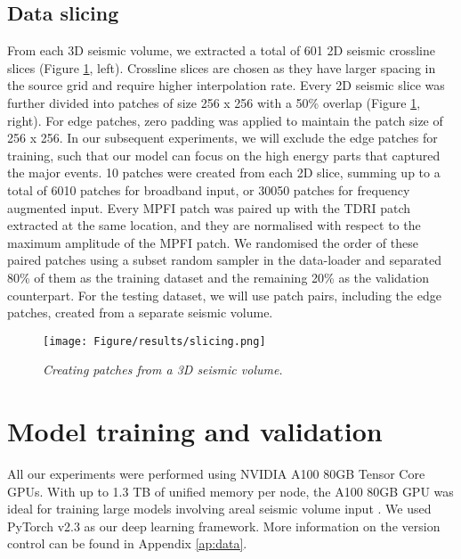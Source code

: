 \subsection{Data slicing}
\label{subsec: data slicing}
From each 3D seismic volume, we extracted a total of 601 2D seismic crossline slices (Figure \ref{fig:data_slicing}, left). Crossline slices are chosen as they have larger spacing in the source grid and require higher interpolation rate. Every 2D seismic slice was further divided into patches of size 256 x 256 with a 50\% overlap (Figure \ref{fig:data_slicing}, right). For edge patches, zero padding was applied to maintain the patch size of 256 x 256. In our subsequent experiments, we will exclude the edge patches for training, such that our model can focus on the high energy parts that captured the major events. 10 patches were created from each 2D slice, summing up to a total of 6010 patches for broadband input, or 30050 patches for frequency augmented input. Every MPFI patch was paired up with the TDRI patch extracted at the same location, and they are normalised with respect to the maximum amplitude of the MPFI patch. We randomised the order of these paired patches using a subset random sampler in the data-loader and separated 80\% of them as the training dataset and the remaining 20\% as the validation counterpart. For the testing dataset, we will use patch pairs, including the edge patches, created from a separate seismic volume. 
\\

\begin{figure}[ht]
	\centering
	\texttt{[image: Figure/results/slicing.png]} %
	\caption{\textit{Creating patches from a 3D seismic volume.}}
	\label{fig:data_slicing}
\end{figure}

\newpage
\section{Model training and validation}
All our experiments were performed using NVIDIA A100 80GB Tensor Core GPUs. With up to 1.3 TB of unified memory per node, the A100 80GB GPU was ideal for training large models involving areal seismic volume input \cite{nvidia2020ampere}. We used PyTorch v2.3 as our deep learning framework. More information on the version control can be found in Appendix \ref{ap:data}.

